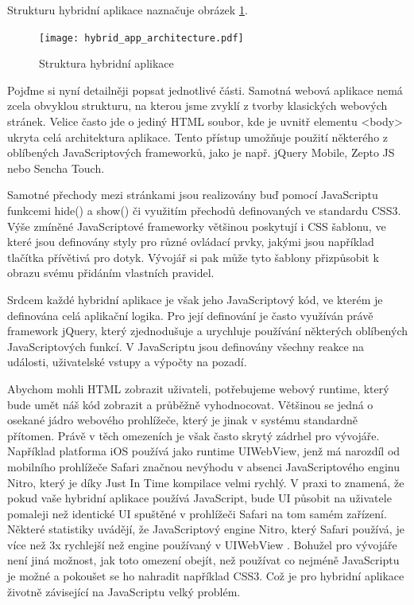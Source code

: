 Strukturu hybridní aplikace naznačuje obrázek \ref{fig:HybridAppArchitecture}.

\begin{figure}\centering
\texttt{[image: hybrid\_app\_architecture.pdf]}
\caption{Struktura hybridní aplikace \cite{ibm_worklight_overview}}
\label{fig:HybridAppArchitecture}
\end{figure} 

Pojďme si nyní detailněji popsat jednotlivé části. Samotná webová aplikace nemá zcela obvyklou strukturu, na kterou jsme zvyklí z tvorby klasických webových stránek. Velice často jde o jediný HTML soubor, kde je uvnitř elementu <body> ukryta celá architektura aplikace. Tento přístup umožňuje použití některého z oblíbených JavaScriptových frameworků, jako je např. jQuery Mobile, Zepto JS nebo Sencha Touch.

Samotné přechody mezi stránkami jsou realizovány buď pomocí JavaScriptu funkcemi hide() a show() či využitím přechodů definovaných ve standardu CSS3. Výše zmíněné JavaScriptové frameworky většinou poskytují i CSS šablonu, ve které jsou definovány styly pro různé ovládací prvky, jakými jsou například tlačítka přívětivá pro dotyk. Vývojář si pak může tyto šablony přizpůsobit k obrazu svému přidáním vlastních pravidel.

Srdcem každé hybridní aplikace je však jeho JavaScriptový kód, ve kterém je definována celá aplikační logika. Pro její definování je často využíván právě framework jQuery, který zjednodušuje a urychluje používání některých oblíbených JavaScriptových funkcí. V JavaScriptu jsou definovány všechny reakce na události, uživatelské vstupy a výpočty na pozadí.

Abychom mohli HTML zobrazit uživateli, potřebujeme webový runtime, který bude umět náš kód zobrazit a průběžně vyhodnocovat. Většinou se jedná o osekané jádro webového prohlížeče, který je jinak v systému standardně přítomen. Právě v těch omezeních je však často skrytý zádrhel pro vývojáře. Například platforma iOS používá jako runtime UIWebView, jenž má narozdíl od mobilního prohlížeče Safari značnou nevýhodu v absenci JavaScriptového enginu Nitro, který je díky Just In Time kompilace velmi rychlý. V praxi to znamená, že pokud vaše hybridní aplikace používá JavaScript, bude UI působit na uživatele pomaleji než identické UI spuštěné v prohlížeči Safari na tom samém zařízení. \cite{primer_on_hybrid_apps} Některé statistiky uvádějí, že JavaScriptový engine Nitro, který Safari používá, je více než 3x rychlejší než engine používaný v UIWebView \cite{ios_for_html5_developer}. Bohužel pro vývojáře není jiná možnost, jak toto omezení obejít, než používat co nejméně JavaScriptu je možné a pokoušet se ho nahradit například CSS3. Což je pro hybridní aplikace životně závisející na JavaScriptu velký problém.

